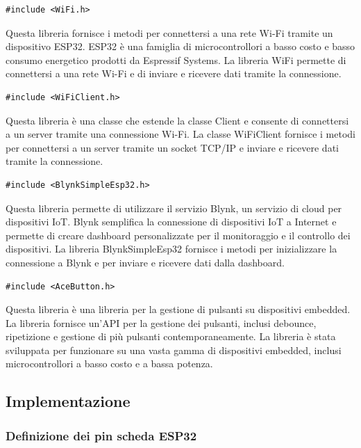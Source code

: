 \begin{verbatim}
#include <WiFi.h>
\end{verbatim} 

Questa libreria fornisce i metodi per connettersi a una rete Wi-Fi tramite un dispositivo ESP32. ESP32 è una famiglia di microcontrollori a basso costo e basso consumo energetico prodotti da Espressif Systems. La libreria WiFi permette di connettersi a una rete Wi-Fi e di inviare e ricevere dati tramite la connessione.

\begin{verbatim}
#include <WiFiClient.h>
\end{verbatim}

Questa libreria è una classe che estende la classe Client e consente di connettersi a un server tramite una connessione Wi-Fi. La classe WiFiClient fornisce i metodi per connettersi a un server tramite un socket TCP/IP e inviare e ricevere dati tramite la connessione.

\begin{verbatim}
#include <BlynkSimpleEsp32.h>
\end{verbatim}

Questa libreria permette di utilizzare il servizio Blynk, un servizio di cloud per dispositivi IoT. Blynk semplifica la connessione di dispositivi IoT a Internet e permette di creare dashboard personalizzate per il monitoraggio e il controllo dei dispositivi. La libreria BlynkSimpleEsp32 fornisce i metodi per inizializzare la connessione a Blynk e per inviare e ricevere dati dalla dashboard.

\begin{verbatim}
#include <AceButton.h>
\end{verbatim}

Questa libreria è una libreria per la gestione di pulsanti su dispositivi embedded. La libreria fornisce un'API per la gestione dei pulsanti, inclusi debounce, ripetizione e gestione di più pulsanti contemporaneamente. La libreria è stata sviluppata per funzionare su una vasta gamma di dispositivi embedded, inclusi microcontrollori a basso costo e a bassa potenza.

\subsection{Implementazione}

\subsubsection{Definizione dei pin scheda ESP32}


